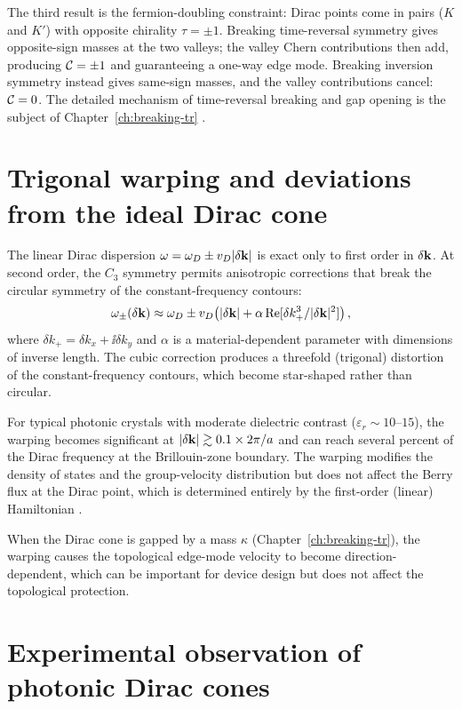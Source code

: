The third result is the fermion-doubling constraint: Dirac points
come in pairs ($K$ and $K'$) with opposite chirality $\tau=\pm 1$.
Breaking time-reversal symmetry gives opposite-sign masses at the
two valleys; the valley Chern contributions then add, producing
$\mathcal{C}=\pm 1$ and guaranteeing a one-way edge mode.  Breaking
inversion symmetry instead gives same-sign masses, and the valley
contributions cancel: $\mathcal{C}=0$.
The detailed mechanism of time-reversal breaking and gap opening is
the subject of Chapter~\ref{ch:breaking-tr}
\cite{haldane2008possible,price2022roadmap}.

\section{Trigonal warping and deviations from the ideal Dirac cone}
\label{sec:ch6-warping}

The linear Dirac dispersion $\omega=\omega_D\pm v_D|\delta\mathbf{k}|$ is
exact only to first order in $\delta\mathbf{k}$.  At second order, the
$C_3$ symmetry permits anisotropic corrections that break the circular
symmetry of the constant-frequency contours:
\begin{equation}\label{eq:ch6-warping}
  \omega_\pm(\delta\mathbf{k})
  \approx \omega_D \pm v_D\bigl(|\delta\mathbf{k}|
  + \alpha\,\mathrm{Re}[\delta k_+^3/|\delta\mathbf{k}|^2]\bigr)\,,
\end{equation}
where $\delta k_+=\delta k_x+\ii\delta k_y$ and $\alpha$ is a
material-dependent parameter with dimensions of inverse length.
The cubic correction produces a threefold (trigonal) distortion of the
constant-frequency contours, which become star-shaped rather than
circular.

For typical photonic crystals with moderate dielectric contrast
($\varepsilon_r\sim 10$--$15$), the warping becomes significant at
$|\delta\mathbf{k}|\gtrsim 0.1\times 2\pi/a$ and can reach several
percent of the Dirac frequency at the Brillouin-zone boundary.  The
warping modifies the density of states and the group-velocity
distribution but does not affect the Berry flux at the Dirac point,
which is determined entirely by the first-order (linear) Hamiltonian
\cite{ozawa2018topological}.

When the Dirac cone is gapped by a mass $\kappa$
(Chapter~\ref{ch:breaking-tr}), the warping causes the topological
edge-mode velocity to become direction-dependent, which can be
important for device design but does not affect the topological
protection.

\section{Experimental observation of photonic Dirac cones}
\label{sec:ch6-experiments}

